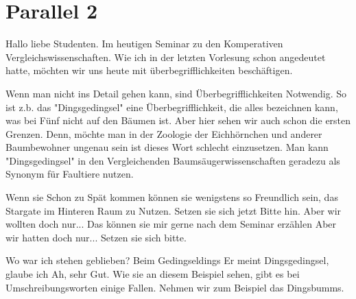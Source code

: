 
\newpage
\section{Parallel 2}
\label{sec:parallel2}
    \charaktere{\Sum, \Gimli, \Prof, \Studa, \Studb, \Studc}

\begin{verseplay}[3em]
\s{\Prof} Hallo liebe Studenten. Im heutigen Seminar zu den Komperativen Vergleichswissenschaften. Wie ich in der letzten Vorlesung schon angedeutet hatte, möchten wir uns heute mit überbegrifflichkeiten beschäftigen.
\end{verseplay}

\begin{verseplay}[3em]
 \s{\Prof} Wenn man nicht ins Detail gehen kann, sind Überbegrifflichkeiten Notwendig. So ist z.b. das "Dingsgedingsel" eine Überbegrifflichkeit, die alles bezeichnen kann, was bei Fünf nicht auf den Bäumen ist. Aber hier sehen wir auch schon die ersten Grenzen. Denn, möchte man in der Zoologie der Eichhörnchen und anderer Baumbewohner ungenau sein ist dieses Wort schlecht einzusetzen. Man kann "Dingsgedingsel" in den Vergleichenden Baumsäugerwissenschaften geradezu als Synonym für Faultiere nutzen.
\end{verseplay}
\begin{verseplay}[3em]
\s\Prof Wenn sie Schon zu Spät kommen können sie wenigstens so Freundlich sein, das Stargate im Hinteren Raum zu Nutzen. Setzen sie sich jetzt Bitte hin.
\s\Gimli Aber wir wollten doch nur...
\s\Prof {} Das können sie mir gerne nach dem Seminar erzählen
\s\Gimli Aber wir hatten doch nur...
\s\Prof {} Setzen sie sich bitte.
\end{verseplay}

\begin{verseplay}[3em]
\s\Prof Wo war ich stehen geblieben?
\s\Studa Beim Gedingseldings
\s\Studb Er meint Dingsgedingsel, glaube ich
\s\Prof Ah, sehr Gut. Wie sie an diesem Beispiel sehen, gibt es bei Umschreibungsworten einige Fallen. Nehmen wir zum Beispiel das Dingsbumms.
\end{verseplay}


